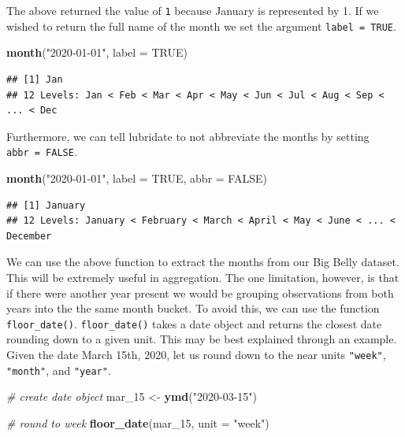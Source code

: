 \documentclass[
]{book}
\newenvironment{Shaded}{\begin{snugshade}}{\end{snugshade}}
\newcommand{\CommentTok}[1]{\textcolor[rgb]{0.56,0.35,0.01}{\textit{#1}}}
\newcommand{\DataTypeTok}[1]{\textcolor[rgb]{0.13,0.29,0.53}{#1}}
\newcommand{\DecValTok}[1]{\textcolor[rgb]{0.00,0.00,0.81}{#1}}
\newcommand{\KeywordTok}[1]{\textcolor[rgb]{0.13,0.29,0.53}{\textbf{#1}}}
\newcommand{\NormalTok}[1]{#1}
\newcommand{\OtherTok}[1]{\textcolor[rgb]{0.56,0.35,0.01}{#1}}
\newcommand{\StringTok}[1]{\textcolor[rgb]{0.31,0.60,0.02}{#1}}
\begin{document}
The above returned the value of \texttt{1} because January is represented by 1. If we wished to return the full name of the month we set the argument \texttt{label\ =\ TRUE}.

\begin{Shaded}
\begin{Highlighting}[]
\KeywordTok{month}\NormalTok{(}\StringTok{"2020{-}01{-}01"}\NormalTok{, }\DataTypeTok{label =} \OtherTok{TRUE}\NormalTok{)}
\end{Highlighting}
\end{Shaded}

\begin{verbatim}
## [1] Jan
## 12 Levels: Jan < Feb < Mar < Apr < May < Jun < Jul < Aug < Sep < ... < Dec
\end{verbatim}

Furthermore, we can tell lubridate to not abbreviate the months by setting \texttt{abbr\ =\ FALSE}.

\begin{Shaded}
\begin{Highlighting}[]
\KeywordTok{month}\NormalTok{(}\StringTok{"2020{-}01{-}01"}\NormalTok{, }\DataTypeTok{label =} \OtherTok{TRUE}\NormalTok{, }\DataTypeTok{abbr =} \OtherTok{FALSE}\NormalTok{)}
\end{Highlighting}
\end{Shaded}

\begin{verbatim}
## [1] January
## 12 Levels: January < February < March < April < May < June < ... < December
\end{verbatim}

We can use the above function to extract the months from our Big Belly dataset. This will be extremely useful in aggregation. The one limitation, however, is that if there were another year present we would be grouping observations from both years into the the same month bucket. To avoid this, we can use the function \texttt{floor\_date()}. \texttt{floor\_date()} takes a date object and returns the closest date rounding down to a given unit. This may be best explained through an example. Given the date March 15th, 2020, let us round down to the near units \texttt{"week"}, \texttt{"month"}, and \texttt{"year"}.

\begin{Shaded}
\begin{Highlighting}[]
\CommentTok{\# create date object}
\NormalTok{mar\_}\DecValTok{15}\NormalTok{ \textless{}{-}}\StringTok{ }\KeywordTok{ymd}\NormalTok{(}\StringTok{"2020{-}03{-}15"}\NormalTok{)}

\CommentTok{\# round to week}
\KeywordTok{floor\_date}\NormalTok{(mar\_}\DecValTok{15}\NormalTok{, }\DataTypeTok{unit =} \StringTok{"week"}\NormalTok{)}
\end{Highlighting}
\end{Shaded}
\end{document}
